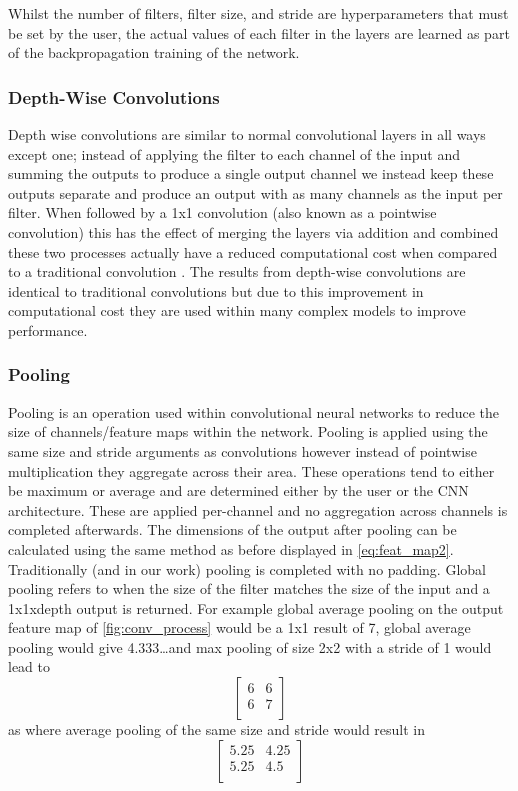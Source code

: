 \documentclass[12pt]{article}
\numberwithin{equation}{section}
\numberwithin{figure}{section}
\begin{document}
Whilst the number of filters, filter size, and stride are hyperparameters that must be set by the user, the actual values of each filter in the layers are learned as part of the backpropagation training of the network.


\subsubsection{Depth-Wise Convolutions}
Depth wise convolutions are similar to normal convolutional layers in all ways except one; instead of applying the filter to each channel of the input and summing the outputs to produce a single output channel we instead keep these outputs separate and produce an output with as many channels as the input per filter.  When followed by a 1x1 convolution (also known as a pointwise convolution) this has the effect of merging the layers via addition and combined these two processes actually have a reduced computational cost when compared to a traditional convolution \cite{Sandler2018}. The results from depth-wise convolutions are identical to traditional convolutions but due to this improvement in computational cost they are used within many complex models to improve performance. 

\subsubsection{Pooling}
Pooling is an operation used within convolutional neural networks to reduce the size of channels/feature maps within the network. Pooling is applied using the same size and stride arguments as convolutions however instead of pointwise multiplication they aggregate across their area. These operations tend to either be maximum or average and are determined either by the user or the CNN architecture. These are applied per-channel and no aggregation across channels is completed afterwards. The dimensions of the output after pooling can be calculated using the same method as before displayed in \cref{eq:feat_map2}. Traditionally (and in our work) pooling is completed with no padding. Global pooling refers to when the size of the filter matches the size of the input and a 1x1xdepth output is returned. For example global average pooling on the output feature map of \cref{fig:conv_process} would be a 1x1 result of 7, global average pooling would give 4.333\dots and max pooling of size 2x2 with a stride of 1 would lead to
$$
\begin{bmatrix}
	6 & 6 \\
	6 & 7 \\
\end{bmatrix}
$$
as where average pooling of the same size and stride would result in
$$
\begin{bmatrix}
	5.25 & 4.25 \\
	5.25 & 4.5 \\
\end{bmatrix}
$$
\end{document}

